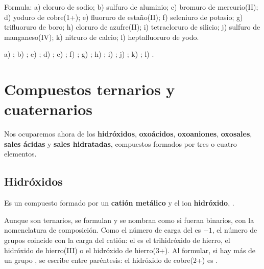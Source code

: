 \begin{exercise}
    Formula: a) cloruro de sodio; b) sulfuro de aluminio; c) bromuro de mercurio(II); d) yoduro de cobre(1+); e) fluoruro de
    estaño(II); f) seleniuro de potasio; g) trifluoruro de boro; h) cloruro de azufre(II); i) tetracloruro de silicio; j)
    sulfuro de manganeso(IV); k) nitruro de calcio; l) heptafluoruro de yodo.
    \begin{solu}
        a) \textcolor{red}{}; b) \textcolor{red}{}; c) \textcolor{red}{}; d) \textcolor{red}{};
        e) \textcolor{red}{}; f) \textcolor{red}{}; g) \textcolor{red}{}; h) \textcolor{red}{};
        i) \textcolor{red}{}; j) \textcolor{red}{}; k) \textcolor{red}{}; l) \textcolor{red}{}.
    \end{solu}
\end{exercise}

\section{Compuestos ternarios y cuaternarios}\label{sec:ud5-ternarios}

Nos ocuparemos ahora de los \textbf{hidróxidos}, \textbf{oxoácidos}, \textbf{oxoaniones}, \textbf{oxosales}, \textbf{sales
ácidas} y \textbf{sales hidratadas}, compuestos formados por tres o cuatro elementos.

\subsection{Hidróxidos}

\begin{definition}[Hidróxido]
    Es un compuesto formado por un \textbf{catión metálico} y el ion \textbf{hidróxido}, .
\end{definition}

Aunque son ternarios, se formulan y se nombran como si fueran binarios, con la nomenclatura de composición. Como el número de
carga del  es \(-1\), el número de grupos  coincide con la carga del catión: el  es el trihidróxido
de hierro, el hidróxido de hierro(III) o el hidróxido de hierro(3+). Al formular, si hay más de un grupo , se escribe
entre paréntesis: el hidróxido de cobre(2+) es .

